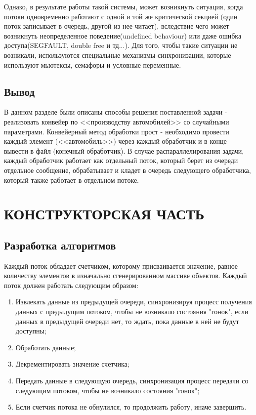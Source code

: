 \documentclass[a4paper,12pt]{article}
\begin{document}
Однако, в результате работы такой системы, может возникнуть ситуация, когда потоки одновременно работают с одной и той же критической секцией (один поток записывает в очередь, другой из нее читает), вследствие чего может возникнуть неопределенное поведение(undefined behaviour) или даже ошибка доступа(SEGFAULT, double free и тд...). Для того, чтобы такие ситуации не возникали, используются специальные механизмы синхронизации, которые используют мьютексы, семафоры и условные переменные.

\newpage
\subsection{Вывод}
В данном разделе были описаны способы решения поставленной задачи - реализовать конвейер по <<производству автомобилей>> со случайными параметрами. Конвейерный метод обработки прост - необходимо провести каждый элемент (<<автомобиль>>) через каждый обработчик и в конце вывести в файл (конечный обработчик). В случае распараллелирования задачи, каждый обработчик работает как отдельный поток, который берет из очереди отдельное сообщение, обрабатывает и кладет в очередь следующего обработчика, который также работает в отдельном потоке.

\newpage
\section{КОНСТРУКТОРСКАЯ ЧАСТЬ}
\subsection{Разработка алгоритмов}
Каждый поток обладает счетчиком, которому присваивается значение, равное количеству элементов в изначально сгенерированном массиве объектов. 
Каждый поток должен работать следующим образом:
\begin{enumerate}
\item Извлекать данные из предыдущей очереди, синхронизируя процесс получения данных с предыдущим потоком, чтобы не возникало состояния "гонок", если данных в предыдущей очереди нет, то ждать, пока данные в ней не будут доступны;
\item Обработать данные;
\item Декрементировать значение счетчика;
\item Передать данные в следующую очередь, синхронизация процесс передачи со следующим потоком, чтобы не возникало состояния "гонок";
\item Если счетчик потока не обнулился, то продолжить работу, иначе завершить.
\end{enumerate}
\end{document}
